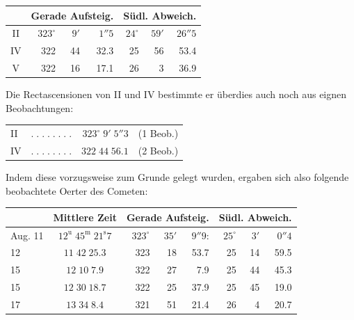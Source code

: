 \begin{center}\fontsize{10}{12}\selectfont\setlength{\tabcolsep}{4pt}\renewcommand{\arraystretch}{1.15}\begin{tabular}{c|rrr|rrr}
& \multicolumn{3}{c|}{Gerade Aufsteig.} & \multicolumn{3}{c}{Südl. Abweich.}\\\hline
II & $323^\circ$ & $9'$ & $1''5$ & $24^\circ$ & $59'$ & $26''5$\\
IV & 322 & 44 & 32.3 & 25 & 56 & 53.4\\
V & 322 & 16 & 17.1 & 26 & 3 & 36.9\\
\end{tabular}\end{center}

\par\indent Die Rectascensionen von II und IV bestimmte er überdies auch noch aus eignen Beobachtungen:

\begin{center}\fontsize{10}{12}\selectfont\setlength{\tabcolsep}{4pt}\renewcommand{\arraystretch}{1.15}\begin{tabular}{lcrl}
II & $.\;.\;.\;.\;.\;.\;.\;.$ & $323^\circ\;9'\;5''3$ & (1 Beob.)\\
IV & $.\;.\;.\;.\;.\;.\;.\;.$ & $322\;44\;56.1$ & (2 Beob.)\\
\end{tabular}\end{center}

\par\indent Indem diese vorzugsweise zum Grunde gelegt wurden, ergaben sich also folgende beobachtete Oerter des Cometen:

\begin{center}\fontsize{9}{11}\selectfont\setlength{\tabcolsep}{3pt}\renewcommand{\arraystretch}{1.15}\begin{tabular}{l|c|rrr|rrr}
& Mittlere Zeit & \multicolumn{3}{c|}{Gerade Aufsteig.} & \multicolumn{3}{c}{Südl. Abweich.}\\\hline
Aug. 11 & $12^{\mathrm u}\;45^{\mathrm m}\;21^{\mathrm s}7$ & $323^\circ$ & $35'$ & $9''9$: & $25^\circ$ & $3'$ & $0''4$\\
12 & $11\;42\;25.3$ & 323 & 18 & 53.7 & 25 & 14 & 59.5\\
15 & $12\;10\;7.9$ & 322 & 27 & 7.9 & 25 & 44 & 45.3\\
15 & $12\;30\;18.7$ & 322 & 25 & 37.9 & 25 & 45 & 19.0\\
17 & $13\;34\;8.4$ & 321 & 51 & 21.4 & 26 & 4 & 20.7\\
\end{tabular}\end{center}

